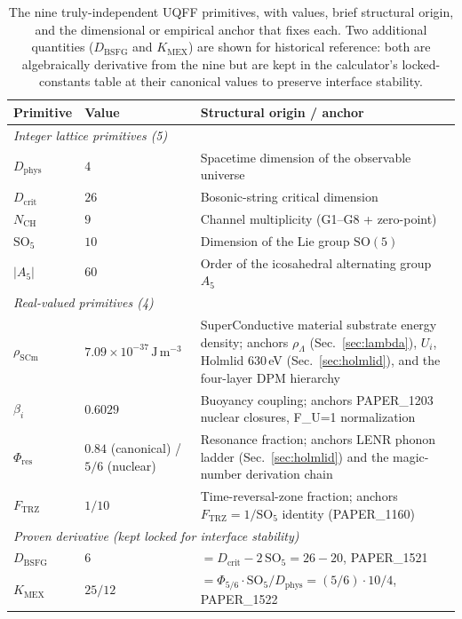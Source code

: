 \begin{table}[H]
\centering
\caption{The nine truly-independent UQFF primitives, with values,
brief structural origin, and the dimensional or empirical anchor
that fixes each. Two additional quantities ($D_{\text{BSFG}}$ and
$K_{\text{MEX}}$) are shown for historical reference: both are
algebraically derivative from the nine but are kept in the
calculator's locked-constants table at their canonical values to
preserve interface stability.}
\label{tab:primitives_master}
\begin{tabular}{l l p{6.0cm}}
\toprule
\textbf{Primitive} & \textbf{Value} & \textbf{Structural origin / anchor} \\
\midrule
\multicolumn{3}{l}{\emph{Integer lattice primitives (5)}} \\
$D_{\text{phys}}$ & $4$ & Spacetime dimension of the observable universe \\
$D_{\text{crit}}$ & $26$ & Bosonic-string critical dimension \cite{Polyakov1981} \\
$N_{\text{CH}}$ & $9$ & Channel multiplicity (G1--G8 + zero-point) \\
$\mathrm{SO}_5$ & $10$ & Dimension of the Lie group $\mathrm{SO}(5)$ \\
$|A_5|$ & $60$ & Order of the icosahedral alternating group $A_5$ \\
\midrule
\multicolumn{3}{l}{\emph{Real-valued primitives (4)}} \\
$\rho_{\text{SCm}}$ & $7.09 \times 10^{-37}\,\mathrm{J\,m^{-3}}$ & SuperConductive material substrate energy density; anchors $\rho_\Lambda$ (Sec.~\ref{sec:lambda}), $U_i$, Holmlid 630\,eV (Sec.~\ref{sec:holmlid}), and the four-layer DPM hierarchy \\
$\beta_i$ & $0.6029$ & Buoyancy coupling; anchors PAPER\_1203 nuclear closures, F\_U=1 normalization \\
$\Phi_{\text{res}}$ & $0.84$ (canonical) / $5/6$ (nuclear) & Resonance fraction; anchors LENR phonon ladder (Sec.~\ref{sec:holmlid}) and the magic-number derivation chain \\
$F_{\text{TRZ}}$ & $1/10$ & Time-reversal-zone fraction; anchors $F_{\text{TRZ}} = 1/\mathrm{SO}_5$ identity (PAPER\_1160) \\
\midrule
\multicolumn{3}{l}{\emph{Proven derivative (kept locked for interface stability)}} \\
$D_{\text{BSFG}}$ & $6$ & $= D_{\text{crit}} - 2\,\mathrm{SO}_5 = 26 - 20$, PAPER\_1521 \\
$K_{\text{MEX}}$ & $25/12$ & $= \Phi_{5/6}\cdot\mathrm{SO}_5/D_{\text{phys}} = (5/6)\cdot 10/4$, PAPER\_1522 \\
\bottomrule
\end{tabular}
\end{table}


